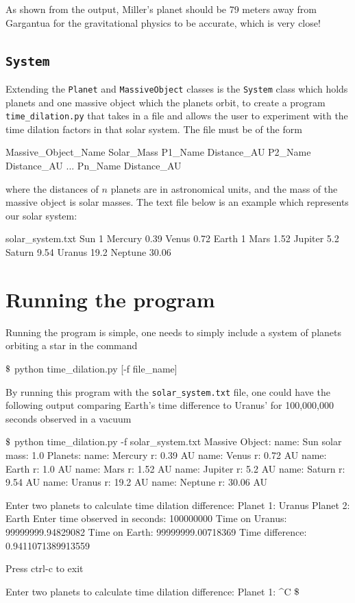 \documentclass{article}
\begin{document}
\noindent As shown from the output, Miller's planet should be 79 meters away from Gargantua for the gravitational physics
to be accurate, which is very close!

\subsection{\texttt{System}}

Extending the \texttt{Planet} and \texttt{MassiveObject} classes is the \texttt{System} class which holds planets and one
massive object which the planets orbit, to create a program \texttt{time\_dilation.py} that takes in a file and allows the 
user to experiment with the time dilation factors in that solar system. The file must be of the form
\begin{bashlisting}{}
Massive_Object_Name Solar_Mass
P1_Name Distance_AU
P2_Name Distance_AU
...
Pn_Name Distance_AU
\end{bashlisting}
where the distances of $n$ planets are in astronomical units, and the mass of the massive object is solar masses.
The text file below is an example which represents our solar system:
\begin{bashlisting}{solar\_system.txt}
Sun 1
Mercury 0.39
Venus 0.72
Earth 1
Mars 1.52
Jupiter 5.2
Saturn 9.54
Uranus 19.2
Neptune 30.06
\end{bashlisting}

\section{Running the program}

Running the program is simple, one needs to simply include a system of planets orbiting a star in the command
\begin{bashlisting}{}
$\mbox{\textdollar}$ python time_dilation.py [-f file_name]
\end{bashlisting}
By running this program with the \texttt{solar\_system.txt} file, one could have the following output comparing Earth's time
difference to Uranus' for 100,000,000 seconds observed in a vacuum
\begin{bashlisting}{}
$\mbox{\textdollar}$ python time_dilation.py -f solar_system.txt
Massive Object:
	name: Sun	    solar mass: 1.0
Planets:
	name: Mercury   r: 0.39 AU
	name: Venus	    r: 0.72 AU
	name: Earth	    r: 1.0 AU
	name: Mars	    r: 1.52 AU
	name: Jupiter   r: 5.2 AU
	name: Saturn    r: 9.54 AU
	name: Uranus    r: 19.2 AU
	name: Neptune   r: 30.06 AU

Enter two planets to calculate time dilation difference:
Planet 1: Uranus
Planet 2: Earth
Enter time observed in seconds: 100000000
Time on Uranus: 99999999.94829082
Time on Earth: 99999999.00718369
Time difference: 0.9411071389913559

Press ctrl-c to exit

Enter two planets to calculate time dilation difference:
Planet 1: ^C
$\mbox{\textdollar}$
\end{bashlisting}
\end{document}
